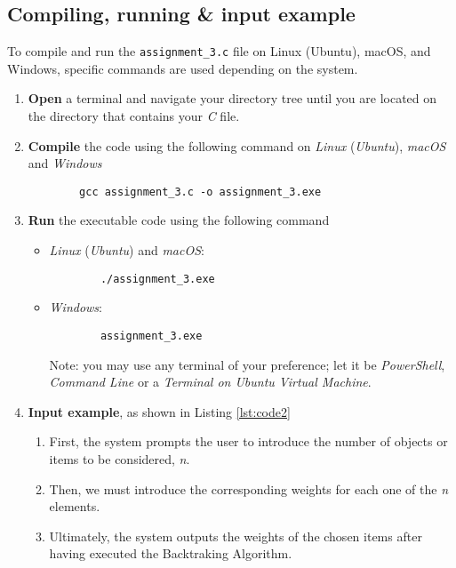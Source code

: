 \documentclass{article}
\begin{document}
\subsection{Compiling, running \& input example}
To compile and run the \texttt{assignment\_3.c} file on Linux (Ubuntu), macOS, and Windows, specific commands are used depending on the system.
\begin{enumerate}
	\item \textbf{Open} a terminal and navigate your directory tree until you are located on the directory that contains your \textit{C} file.

	\item \textbf{Compile} the code using the following command on \emph{Linux} (\emph{Ubuntu}), \emph{macOS} and \emph{Windows}
	      \begin{verbatim}
        gcc assignment_3.c -o assignment_3.exe
        \end{verbatim}

	\item \textbf{Run} the executable code using the following command
	      \begin{itemize}
		      \item \emph{Linux} (\emph{Ubuntu}) and \emph{macOS}:
		            \begin{verbatim}
        ./assignment_3.exe
        \end{verbatim}
		      \item \emph{Windows}:
		            \begin{verbatim}
        assignment_3.exe
        \end{verbatim}
		            Note: you may use any terminal of your preference; let it be \emph{PowerShell}, \emph{Command Line} or
		            a \emph{Terminal on Ubuntu Virtual Machine}.
	      \end{itemize}

	\item \textbf{Input example}, as shown in Listing \ref{lst:code2}
	      \begin{enumerate}
		      \item First, the system prompts the user to introduce the number of objects or items to be considered, \textit{n}.
		      \item Then, we must introduce the corresponding weights for each one of the \textit{n} elements.
		      \item Ultimately, the system outputs the weights of the chosen items after having executed the Backtraking Algorithm.
	      \end{enumerate}


\end{enumerate}
\end{document}
